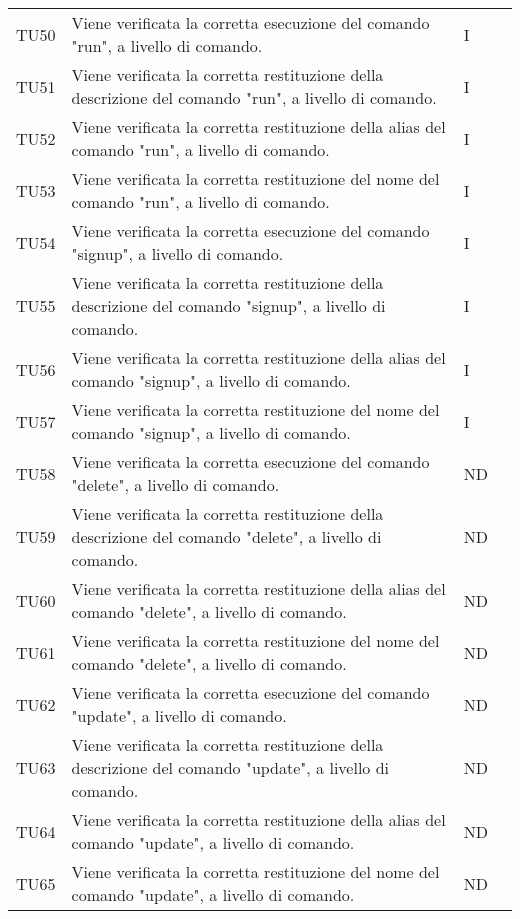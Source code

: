 \begin{longtable}{|C{1.5cm}|C{8cm}|C{3cm}|C{1cm}|}
	TU50 &
	Viene verificata la corretta esecuzione del comando "run", a livello di comando.  &
	I \\

	TU51 &
	Viene verificata la corretta restituzione della descrizione del comando "run", a livello di comando.  &
	I \\

	TU52 &
	Viene verificata la corretta restituzione della alias del comando "run", a livello di comando.  &
	I \\

	TU53 &
	Viene verificata la corretta restituzione del nome del comando "run", a livello di comando.  &
	I \\

	TU54 &
	Viene verificata la corretta esecuzione del comando "signup", a livello di comando.  &
	I \\

	TU55 &
	Viene verificata la corretta restituzione della descrizione del comando "signup", a livello di comando.  &
	I \\

	TU56 &
	Viene verificata la corretta restituzione della alias del comando "signup", a livello di comando.  &
	I \\

	TU57 &
	Viene verificata la corretta restituzione del nome del comando "signup", a livello di comando.  &
	I \\

	TU58 &
	Viene verificata la corretta esecuzione del comando "delete", a livello di comando.  &
	ND \\

	TU59 &
	Viene verificata la corretta restituzione della descrizione del comando "delete", a livello di comando.  &
	ND \\

	TU60 &
	Viene verificata la corretta restituzione della alias del comando "delete", a livello di comando.  &
	ND \\

	TU61 &
	Viene verificata la corretta restituzione del nome del comando "delete", a livello di comando.  &
	ND \\

	TU62 &
	Viene verificata la corretta esecuzione del comando "update", a livello di comando.  &
	ND \\

	TU63 &
	Viene verificata la corretta restituzione della descrizione del comando "update", a livello di comando.  &
	ND \\

	TU64 &
	Viene verificata la corretta restituzione della alias del comando "update", a livello di comando.  &
	ND \\

	TU65 &
	Viene verificata la corretta restituzione del nome del comando "update", a livello di comando.  &
	ND \\
\end{longtable}

